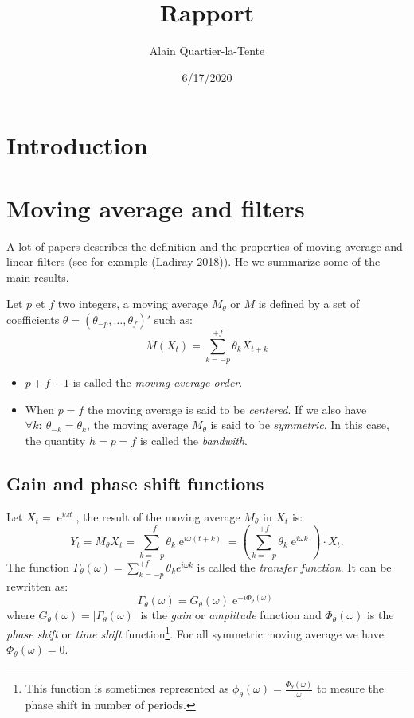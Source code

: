 \documentclass[
  12pt,
  ,
  a4paper]{article}
\title{Rapport}
\author{Alain Quartier-la-Tente}
\date{6/17/2020}
\DeclareMathOperator{\e}{e}
\newcommand\1{\mathds{1}}
\begin{document}
\maketitle

{
\hypersetup{linkcolor=}
\setcounter{tocdepth}{3}
\tableofcontents
}
\newpage

\hypertarget{introduction}{%
\section{Introduction}\label{introduction}}

\hypertarget{moving-average-and-filters}{%
\section{Moving average and filters}\label{moving-average-and-filters}}

A lot of papers describes the definition and the properties of moving average and linear filters (see for example (Ladiray 2018)).
He we summarize some of the main results.

Let \(p\) et \(f\) two integers, a moving average \(M_\theta\) or \(M\) is defined by a set of coefficients \(\theta=(\theta_{-p},\dots,\theta_{f})'\) such as:
\[
M(X_t)=\sum_{k=-p}^{+f}\theta_kX_{t+k}
\]

\begin{itemize}
\item
  \(p+f+1\) is called the \emph{moving average order}.
\item
  When \(p=f\) the moving average is said to be \emph{centered}.
  If we also have \(\forall k:\:\theta_{-k} = \theta_k\), the moving average \(M_\theta\) is said to be \emph{symmetric}.
  In this case, the quantity \(h=p=f\) is called the \emph{bandwith}.
\end{itemize}

\hypertarget{gain-and-phase-shift-functions}{%
\subsection{Gain and phase shift functions}\label{gain-and-phase-shift-functions}}

Let \(X_t=\e^{i\omega t}\), the result of the moving average \(M_\theta\) in \(X_t\) is:
\[
Y_t = M_{\theta}X_t = \sum_{k=-p}^{+f} \theta_k \e^{i \omega (t+k)}
= \left(\sum_{k=-p}^{+f} \theta_k \e^{i \omega k}\right)\cdot X_t.
\]
The function \(\Gamma_\theta(\omega)=\sum_{k=-p}^{+f} \theta_k e^{i \omega k}\) is called the \emph{transfer function}.
It can be rewritten as:
\[
\Gamma_\theta(\omega) = G_\theta(\omega)\e^{-i\Phi_\theta(\omega)}
\]
where \(G_\theta(\omega)=\lvert\Gamma_\theta(\omega)\rvert\) is the \emph{gain} or \emph{amplitude} function and \(\Phi_\theta(\omega)\) is the \emph{phase shift} or \emph{time shift} function\footnote{This function is sometimes represented as \(\phi_\theta(\omega)=\frac{\Phi_\theta(\omega)}{\omega}\) to mesure the phase shift in number of periods.}.
For all symmetric moving average we have \(\Phi_\theta(\omega)=0\).
\end{document}
